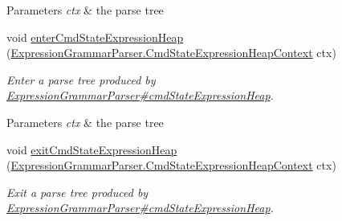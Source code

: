 \begin{DoxyCompactItemize}
\begin{DoxyCompactList}
\begin{DoxyParams}{Parameters}
{\em ctx} & the parse tree\\
\hline
\end{DoxyParams}
 \end{DoxyCompactList}\item 
void \hyperlink{classgov_1_1nasa_1_1jpf_1_1inspector_1_1server_1_1expression_1_1parser_1_1_expression_grammar_base_listener_a5e82068b242ff404697a1f23ffd4754d}{enter\+Cmd\+State\+Expression\+Heap} (\hyperlink{classgov_1_1nasa_1_1jpf_1_1inspector_1_1server_1_1expression_1_1parser_1_1_expression_grammar_pa4cb3092c60a124c5db4482cce4b4fe10}{Expression\+Grammar\+Parser.\+Cmd\+State\+Expression\+Heap\+Context} ctx)
\begin{DoxyCompactList}\small\item\em Enter a parse tree produced by \hyperlink{classgov_1_1nasa_1_1jpf_1_1inspector_1_1server_1_1expression_1_1parser_1_1_expression_grammar_parser_a5b90970e937c56fb82d43184d3d4d763}{Expression\+Grammar\+Parser\#cmd\+State\+Expression\+Heap}.


\begin{DoxyParams}{Parameters}
{\em ctx} & the parse tree\\
\hline
\end{DoxyParams}
 \end{DoxyCompactList}\item 
void \hyperlink{classgov_1_1nasa_1_1jpf_1_1inspector_1_1server_1_1expression_1_1parser_1_1_expression_grammar_base_listener_a950b7d56728803ecfa4de2c1a1707803}{exit\+Cmd\+State\+Expression\+Heap} (\hyperlink{classgov_1_1nasa_1_1jpf_1_1inspector_1_1server_1_1expression_1_1parser_1_1_expression_grammar_pa4cb3092c60a124c5db4482cce4b4fe10}{Expression\+Grammar\+Parser.\+Cmd\+State\+Expression\+Heap\+Context} ctx)
\begin{DoxyCompactList}\small\item\em Exit a parse tree produced by \hyperlink{classgov_1_1nasa_1_1jpf_1_1inspector_1_1server_1_1expression_1_1parser_1_1_expression_grammar_parser_a5b90970e937c56fb82d43184d3d4d763}{Expression\+Grammar\+Parser\#cmd\+State\+Expression\+Heap}.



\end{DoxyCompactList}
\end{DoxyCompactItemize}
